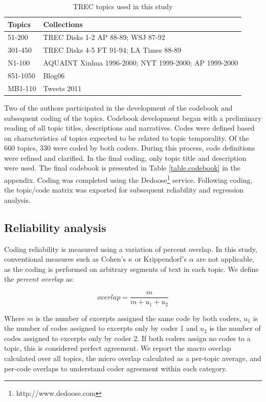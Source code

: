 \documentclass{sig-alternate}
\begin{document}
\begin{table}
\small
\begin{tabular}{| l |  p{6cm} |} \hline
\bf{Topics} & \bf{Collections}  \\ \hline
51-200 & TREC Disks 1-2 AP 88-89; WSJ 87-92 \\ \hline
301-450 &  TREC Disks 4-5 FT 91-94; LA Times 88-89 \\ \hline
N1-100 & AQUAINT Xinhua 1996-2000; NYT 1999-2000; AP 1999-2000 \\ \hline
851-1050 & Blog06  \\ \hline
MB1-110 & Tweets 2011 \\ \hline
\end{tabular}
\caption{TREC topics used in this study}
\label{table.topics}
\end{table}

Two of the authors participated in the development of the codebook and subsequent coding of the topics.  Codebook development began with a preliminary reading of all topic titles, descriptions and narratives. Codes were defined based on characteristics of topics expected to be related to topic temporality.  Of the 660 topics, 330 were coded by both coders. During this process, code definitions were refined and clarified. In the final coding, only topic title and description were used. The final codebook is presented in Table \ref{table.codebook} in the appendix.  Coding was completed using the Dedoose\footnote{http://www.dedoose.com} service.  Following coding, the topic/code matrix was exported for subsequent reliability and regression analysis.

\subsection{Reliability analysis}
Coding reliability is measured using a variation of percent overlap.  In this study, conventional measures such as Cohen's $\kappa$ or Krippendorf's $\alpha$ are not applicable, as the coding is performed on arbitrary segments of text in each topic.  We define the \emph{percent overlap} as:

\[
overlap = \frac{m}{m + u_1 + u_2} 
\]

Where $m$ is the number of excerpts assigned the same code by both coders, $u_1$ is the number of codes assigned to excerpts only by coder 1 and $u_2$ is the number of codes assigned to excerpts only by coder 2. If both coders assign no codes to a topic, this is considered perfect agreement. We report the macro overlap calculated over all topics, the micro overlap calculated as a per-topic average, and per-code overlaps to understand coder agreement within each category.
\end{document}
